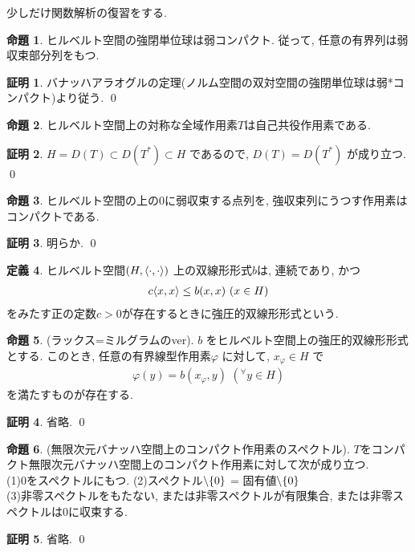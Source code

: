 \documentclass[10pt, fleqn, label-section=none]{bxjsarticle}
\theoremstyle{definition}
\newtheorem{dfn}{定義}[section]
\newtheorem{prop}[dfn]{命題}
\newtheorem*{pf*}{証明}
\newcommand{\any}{{}^{\forall}}
\newcommand{\cbra}[1]{\mleft\{#1\mright\}}
\newcommand{\tbra}[1]{\mleft\langle#1\mright\rangle}
\renewcommand{\-}{\hyphen}
\begin{document}
少しだけ関数解析の復習をする.

\begin{prop}
ヒルベルト空間の強閉単位球は弱コンパクト. 従って, 任意の有界列は弱収束部分列をもつ.
\end{prop}
\begin{pf*}
バナッハアラオグルの定理(ノルム空間の双対空間の強閉単位球は弱*コンパクト)より従う.
\qed
\end{pf*}

\begin{prop}
ヒルベルト空間上の対称な全域作用素$T$は自己共役作用素である.
\end{prop}
\begin{pf*}
$H = D(T) \subset D(T^*) \subset H$ であるので, $D(T) = D(T^*)$ が成り立つ. 
\qed
\end{pf*}

\begin{prop}
ヒルベルト空間の上の$0$に弱収束する点列を, 強収束列にうつす作用素はコンパクトである.
\end{prop}
\begin{pf*}
明らか.
\qed
\end{pf*}

\begin{dfn}
ヒルベルト空間$(H, \tbra{\cdot,\cdot})$ 上の双線形形式$b$は, 連続であり, かつ
\begin{align*} c \tbra{x,x} \leq b(x,x) \,\, (x \in H) \end{align*}
をみたす正の定数$c>0$が存在するときに強圧的双線形形式という. 
\end{dfn}

\begin{prop}(ラックス=ミルグラムのver).
$b$ をヒルベルト空間上の強圧的双線形形式とする. このとき, 任意の有界線型作用素$\varphi $ に対して, $x_\varphi \in H$ で
\begin{align*} \varphi(y) = b(x_\varphi , y) \,\, (\any y \in H)\end{align*}
を満たすものが存在する. 
\end{prop}
\begin{pf*}
省略.
\qed
\end{pf*}

\begin{prop}(無限次元バナッハ空間上のコンパクト作用素のスペクトル).
$T$をコンパクト無限次元バナッハ空間上のコンパクト作用素に対して次が成り立つ. \\
(1)$0$をスペクトルにもつ.
(2)スペクトル$\setminus \cbra{0}$ = 固有値$\setminus \cbra{0}$ \\
(3)非零スペクトルをもたない, または非零スペクトルが有限集合, または非零スペクトルは$0$に収束する. 
\end{prop}
\begin{pf*}
省略.
\qed
\end{pf*}
\end{document}
